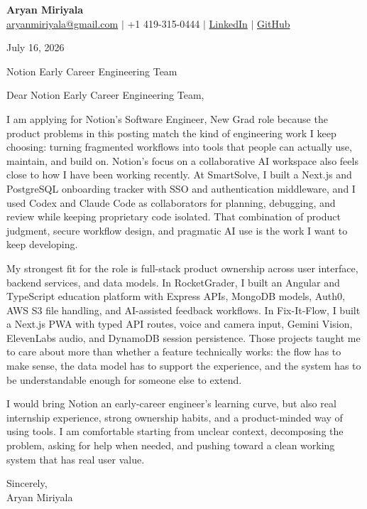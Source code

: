 \documentclass[letterpaper,11pt]{article}
\begin{document}
{\Large\textbf{Aryan Miriyala}}\\
\href{mailto:aryanmiriyala@gmail.com}{aryanmiriyala@gmail.com} $|$ +1 419-315-0444 $|$
\href{https://www.linkedin.com/in/aryan-miriyala-7788a21b6/}{LinkedIn} $|$
\href{https://github.com/aryanmiriyala}{GitHub}

July 16, 2026

Notion Early Career Engineering Team

Dear Notion Early Career Engineering Team,

I am applying for Notion's Software Engineer, New Grad role because the product problems in this posting match the kind of engineering work I keep choosing: turning fragmented workflows into tools that people can actually use, maintain, and build on. Notion's focus on a collaborative AI workspace also feels close to how I have been working recently. At SmartSolve, I built a Next.js and PostgreSQL onboarding tracker with SSO and authentication middleware, and I used Codex and Claude Code as collaborators for planning, debugging, and review while keeping proprietary code isolated. That combination of product judgment, secure workflow design, and pragmatic AI use is the work I want to keep developing.

My strongest fit for the role is full-stack product ownership across user interface, backend services, and data models. In RocketGrader, I built an Angular and TypeScript education platform with Express APIs, MongoDB models, Auth0, AWS S3 file handling, and AI-assisted feedback workflows. In Fix-It-Flow, I built a Next.js PWA with typed API routes, voice and camera input, Gemini Vision, ElevenLabs audio, and DynamoDB session persistence. Those projects taught me to care about more than whether a feature technically works: the flow has to make sense, the data model has to support the experience, and the system has to be understandable enough for someone else to extend.

I would bring Notion an early-career engineer's learning curve, but also real internship experience, strong ownership habits, and a product-minded way of using tools. I am comfortable starting from unclear context, decomposing the problem, asking for help when needed, and pushing toward a clean working system that has real user value.

Sincerely,\\
Aryan Miriyala
\end{document}
